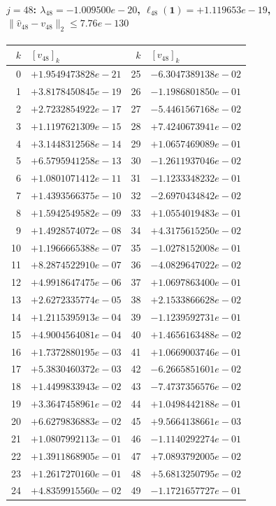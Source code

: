 \documentclass[11pt]{article}
\begin{document}
\paragraph{$j = 48$: $\lambda_{48} = -1.009500e-20$, \quad $\ell_{48}(\mathbf{1}) = +1.119653e-19$, \quad $\|\hat{v}_{48} - v_{48}\|_2 \leq 7.76e-130$}
\begin{center}
{\footnotesize
\begin{tabular}{r@{\;\;}l@{\quad}r@{\;\;}l}
\toprule
$k$ & $[v_{48}]_k$ & $k$ & $[v_{48}]_k$ \\
\midrule
0 & $+1.9549473828e-21$ & 25 & $-6.3047389138e-02$ \\
1 & $+3.8178450845e-19$ & 26 & $-1.1986801850e-01$ \\
2 & $+2.7232854922e-17$ & 27 & $-5.4461567168e-02$ \\
3 & $+1.1197621309e-15$ & 28 & $+7.4240673941e-02$ \\
4 & $+3.1448312568e-14$ & 29 & $+1.0657469089e-01$ \\
5 & $+6.5795941258e-13$ & 30 & $-1.2611937046e-02$ \\
6 & $+1.0801071412e-11$ & 31 & $-1.1233348232e-01$ \\
7 & $+1.4393566375e-10$ & 32 & $-2.6970434842e-02$ \\
8 & $+1.5942549582e-09$ & 33 & $+1.0554019483e-01$ \\
9 & $+1.4928574072e-08$ & 34 & $+4.3175615250e-02$ \\
10 & $+1.1966665388e-07$ & 35 & $-1.0278152008e-01$ \\
11 & $+8.2874522910e-07$ & 36 & $-4.0829647022e-02$ \\
12 & $+4.9918647475e-06$ & 37 & $+1.0697863400e-01$ \\
13 & $+2.6272335774e-05$ & 38 & $+2.1533866628e-02$ \\
14 & $+1.2115395913e-04$ & 39 & $-1.1239592731e-01$ \\
15 & $+4.9004564081e-04$ & 40 & $+1.4656163488e-02$ \\
16 & $+1.7372880195e-03$ & 41 & $+1.0669003746e-01$ \\
17 & $+5.3830460372e-03$ & 42 & $-6.2665851601e-02$ \\
18 & $+1.4499833943e-02$ & 43 & $-7.4737356576e-02$ \\
19 & $+3.3647458961e-02$ & 44 & $+1.0498442188e-01$ \\
20 & $+6.6279836883e-02$ & 45 & $+9.5664138661e-03$ \\
21 & $+1.0807992113e-01$ & 46 & $-1.1140292274e-01$ \\
22 & $+1.3911868905e-01$ & 47 & $+7.0893792005e-02$ \\
23 & $+1.2617270160e-01$ & 48 & $+5.6813250795e-02$ \\
24 & $+4.8359915560e-02$ & 49 & $-1.1721657727e-01$ \\
\bottomrule
\end{tabular}
}
\end{center}
\end{document}

